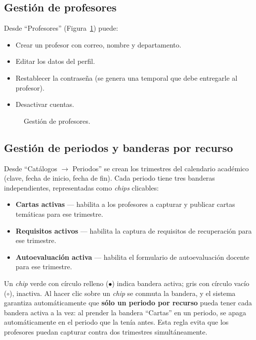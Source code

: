 \documentclass{computacion}
\begin{document}
\subsection{Gestión de profesores}
\label{sec:admin-profesores}
Desde ``Profesores'' (Figura~\ref{fig:m-admin-prof}) puede:
\begin{itemize}
    \item Crear un profesor con correo, nombre y departamento.
    \item Editar los datos del perfil.
    \item Restablecer la contraseña (se genera una temporal que debe entregarle al profesor).
    \item Desactivar cuentas.
\end{itemize}

\begin{figure}[!ht]
    \centering
    \caption{Gestión de profesores.}
    \label{fig:m-admin-prof}
\end{figure}

\subsection{Gestión de periodos y banderas por recurso}
\label{sec:admin-periodos}

Desde ``Catálogos $\to$ Periodos'' se crean los trimestres del calendario académico (clave, fecha de inicio, fecha de fin). Cada periodo tiene tres banderas independientes, representadas como \emph{chips} clicables:

\begin{itemize}
    \item \textbf{Cartas activas} — habilita a los profesores a capturar y publicar cartas temáticas para ese trimestre.
    \item \textbf{Requisitos activos} — habilita la captura de requisitos de recuperación para ese trimestre.
    \item \textbf{Autoevaluación activa} — habilita el formulario de autoevaluación docente para ese trimestre.
\end{itemize}

Un \emph{chip} verde con círculo relleno ($\bullet$) indica bandera activa; gris con círculo vacío ($\circ$), inactiva. Al hacer clic sobre un \emph{chip} se conmuta la bandera, y el sistema garantiza automáticamente que \textbf{sólo un periodo por recurso} pueda tener cada bandera activa a la vez: al prender la bandera ``Cartas'' en un periodo, se apaga automáticamente en el periodo que la tenía antes. Esta regla evita que los profesores puedan capturar contra dos trimestres simultáneamente.
\end{document}

